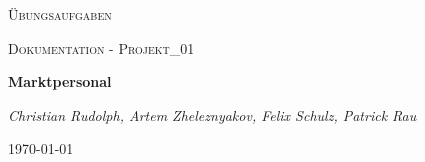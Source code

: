 \documentclass[a4paper]{article}
\begin{document}
\begin{titlepage}
	\centering
	{\scshape\LARGE Übungsaufgaben \par}
	\vspace{1cm}
	{\scshape\Large Dokumentation - Projekt_01\par}
	\vspace{1.5cm}
	{\huge\bfseries Marktpersonal \par}
	\vspace{2cm}
	{\Large\itshape Christian Rudolph, Artem Zheleznyakov, Felix Schulz, Patrick Rau\par}
	\vfill

	{\large \today\par}
\end{titlepage}
\tableofcontents

\begin{abstract}



\end{abstract}						
\end{document}

